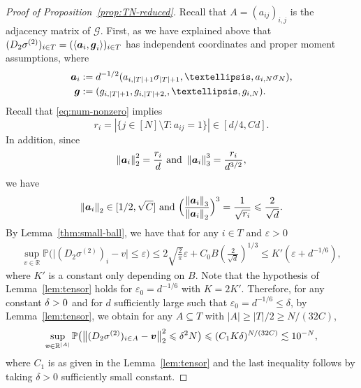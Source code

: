 \documentclass[letterpaper,11pt,reqno]{amsart}
\renewcommand{\le}{\leqslant}
\renewcommand{\ge}{\geqslant}
\newcommand{\ra}{\rangle}
\newcommand{\la}{\langle}
\newcommand{\eps}{\varepsilon}
\newcommand{\norm}[1]{\left\Vert#1\right\Vert}
\newcommand{\abs}[1]{\left\vert#1\right\vert}
\newcommand{\mvgs}{{\sigma}}
\newcommand{\bP}{\mathbb{P}}\newcommand{\bQ}{\mathbb{Q}}\newcommand{\bR}{\mathbb{R}}
\begin{document}
\begin{proof}[Proof of Proposition~\ref{prop:TN-reduced}]

Recall that $A=(a_{ij})_{i,j}$ is the adjacency matrix of $\mathcal{G}.$
First, as we have explained above that $(D_2\mvgs^{(2)})_{i\in T} = (\la \mva_i ,\mvg_i \ra)_{i\in T}$ 
has independent coordinates and proper moment assumptions, where \begin{align*}
    \mva_i &:= d^{-1/2} (a_{i,\abs{T}+1} \gs_{\abs{T}+1},\ldots, a_{i,N} \gs_{N}),\\
    \mvg&:=(g_{i,|T|+1}, g_{i,|T|+2,}, \ldots, g_{i,N}).
\end{align*}
Recall that \eqref{eq:num-nonzero} implies 
\[
r_i =\abs{\{j\in [N]\setminus T: a_{ij} =1 \}} \in [d/4, C d].
\]
In addition, since
\begin{align*}
    \norm{\mva_i}_2^2 = \frac{r_i}{d}\,\, \text{and} \,\,\norm{\mva_i}_3^3 = \frac{r_i}{d^{3/2}},
\end{align*}
we have 
\[
\norm{\mva_i}_2 \in [1/2, \sqrt{C}]\,\,\text{and}\,\, \Bigl( \frac{\norm{\mva_i}_3}{\norm{\mva_i}_2}\Bigr)^3  
= \frac{1}{\sqrt{r_i}} \le \frac{2}{\sqrt{d}}. 
\]
By Lemma~\ref{thm:small-ball}, we have that for any $i\in T$ and $\eps>0$
\begin{align}\label{eq:small-ball-1d}
\sup_{v\in \bR} \bP\bigl(\bigl|(D_2\mvgs^{(2)})_i - v\bigr|\le \eps\bigr) \le 2\sqrt{\frac{2}{\pi}}\eps + C_0 B \left( \frac{2}{\sqrt{d}}\right)^{1/3} \le K'( \eps + d^{-1/6}),
\end{align}
where $K'$ is a constant only depending on $B$. Note that the hypothesis of Lemma~\ref{lem:tensor} holds for $\eps_0 = d^{-1/6}$ with $K = 2K'$. 
Therefore, for any constant $\delta >0$ and for $d$ sufficiently large such that $\eps_0 = d^{-1/6} \le \delta $, by Lemma~\ref{lem:tensor}, we obtain for any $A \subseteq T$ with $\abs{A} \ge \abs{T}/{2}\ge {N}/(32C)$,
\[
\sup_{\mvv \in \bR^{\abs{A}}} \bP\bigl(\bigl\|(D_2 \mvgs^{(2)})_{i\in A} - \mvv\bigr\|_2^2 \le \gd^2 N\bigr) \le 
(C_1 K \delta)^{N/(32 C)}
\lesssim 10^{-N},
\]
where $C_1$ is as given in the Lemma~\ref{lem:tensor} and the last inequality follows by taking $\delta >0$ sufficiently small constant. 


\end{proof}
\end{document}
